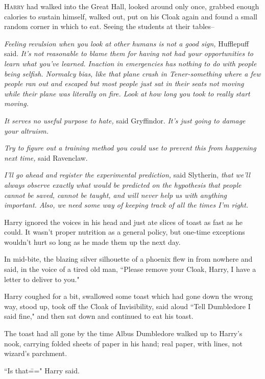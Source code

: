 
\lettrine{H}{arry} had walked into the Great Hall, looked around only once, grabbed enough calories to sustain himself, walked out, put on his Cloak again and found a small random corner in which to eat. Seeing the students at their tables\---

\emph{Feeling revulsion when you look at other humans is not a good sign,} Hufflepuff said. \emph{It's not reasonable to blame them for having not had your opportunities to learn what you've learned. Inaction in emergencies has nothing to do with people being selfish. Normalcy bias, like that plane crash in Tener-something where a few people ran out and escaped but most people just sat in their seats not moving while their plane was literally on fire. Look at how long \emph{you} took to really start moving.}

\emph{It serves no useful purpose to hate,} said Gryffindor. \emph{It's just going to damage your altruism.}

\emph{Try to figure out a training method you could use to prevent this from happening next time,} said Ravenclaw.

\emph{I'll go ahead and register the experimental prediction,} said Slytherin, \emph{that we'll always observe exactly what would be predicted on the hypothesis that people cannot be saved, cannot be taught, and will never help us with anything important. Also, we need some way of keeping track of all the times I'm right.}

Harry ignored the voices in his head and just ate slices of toast as fast as he could. It wasn't proper nutrition as a general policy, but one-time exceptions wouldn't hurt so long as he made them up the next day.

In mid-bite, the blazing silver silhouette of a phoenix flew in from nowhere and said, in the voice of a tired old man, ``Please remove your Cloak, Harry, I have a letter to deliver to you."

Harry coughed for a bit, swallowed some toast which had gone down the wrong way, stood up, took off the Cloak of Invisibility, said aloud ``Tell Dumbledore I said fine," and then sat down and continued to eat his toast.

The toast had all gone by the time Albus Dumbledore walked up to Harry's nook, carrying folded sheets of paper in his hand; real paper, with lines, not wizard's parchment.

``Is that\===" Harry said.

